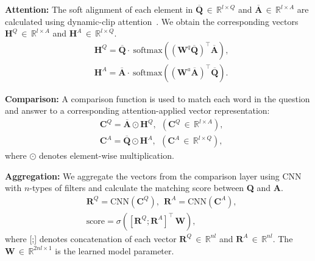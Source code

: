 \documentclass[sigconf]{acmart}
\begin{document}
\vspace*{1mm}
\noindent\textbf{Attention: }
The soft alignment of each element in $\overline{\textbf{Q}}\,{\in}\,\mathbb{R}^{l\times Q}$ and $\overline{\textbf{A}}\,{\in}\,\mathbb{R}^{l\times A}$ are calculated using dynamic-clip attention~\cite{bian2017compare}. We obtain the corresponding vectors $\textbf{H}^Q\,{\in}\,\mathbb{R}^{l\times A}$ and $\textbf{H}^A\,{\in}\,\mathbb{R}^{l\times Q}$.
\begin{equation}
\begin{aligned}
& \textbf{H}^Q= \overline{\textbf{Q}}\cdot~\text{softmax}({(\textbf{W}^{q}\overline{\textbf{Q}})}^{\intercal}\overline{\textbf{A}}),\\
& \textbf{H}^A= \overline{\textbf{A}}\cdot~\text{softmax}({(\textbf{W}^{a}\overline{\textbf{A}})}^{\intercal}\overline{\textbf{Q}}).
\end{aligned}
\label{eq:attention}
\end{equation}

\vspace*{1mm}
\noindent\textbf{Comparison: }
A comparison function is used to match each word in the question and answer to a corresponding attention-applied vector representation:
\begin{equation}
\begin{aligned}
& \textbf{C}^Q = \overline{\textbf{A}} \odot \textbf{H}^Q, ~~(\textbf{C}^Q\,{\in}\,\mathbb{R}^{l\times A}),\\
& \textbf{C}^A = \overline{\textbf{Q}} \odot \textbf{H}^A, ~~(\textbf{C}^A\,{\in}\,\mathbb{R}^{l\times Q}),
\end{aligned}
\label{eq:comparison}
\end{equation}
where $\odot$ denotes element-wise multiplication.

\vspace*{1mm}
\noindent\textbf{Aggregation: }
We aggregate the vectors from the comparison layer using CNN~\cite{kim2014convolutional} with $n$-types of filters and calculate the matching score between \textbf{Q} and \textbf{A}.
\begin{equation}
\begin{aligned}
& \textbf{R}^Q=\text{CNN}(\textbf{C}^Q),~~\textbf{R}^A=\text{CNN}(\textbf{C}^A), \\
& \text{score}=\sigma([\textbf{R}^Q;\textbf{R}^A]^{\intercal}\,\textbf{W}),
\end{aligned}
\label{eq:aggregation}
\end{equation}
where [;] denotes concatenation of each vector $\textbf{R}^Q\,{\in}\,\mathbb{R}^{nl}$ and $\textbf{R}^A\,{\in}\,\mathbb{R}^{nl}$. The $\textbf{W}\,{\in}\,\mathbb{R}^{2nl\times 1}$ is the learned model parameter.
\end{document}

